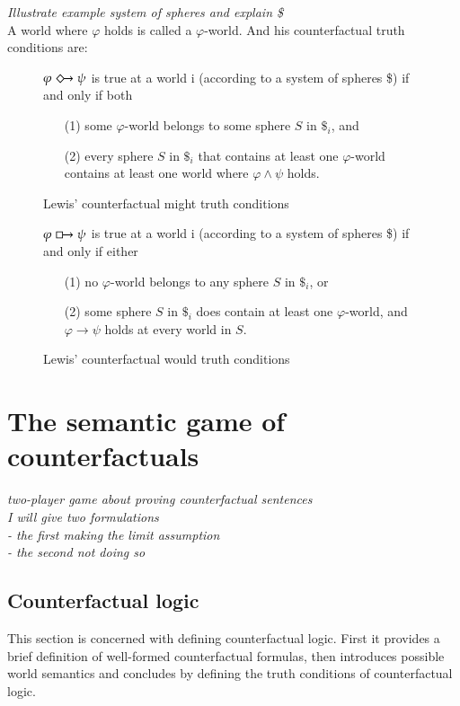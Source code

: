 \documentclass[a4paper,american]{paper}
\theoremstyle{definition}\newtheorem{definition}{Definition}
\begin{document}
\noindent \textit{Illustrate example system of spheres and explain \$}\\
A world where $\varphi$ holds is called a $\varphi$-world.
\noindent And his counterfactual truth conditions are:
\begin{figure}[H]
	\centering
	$\varphi\Diamondright\psi$ is true at a world i (according to a system of spheres \$) if and only if both
	\begin{itemize}
	\item[(1)] some $\varphi$-world belongs to some sphere $S$ in $\$_i$, and
	\item[(2)] every sphere $S$ in $\$_i$ that contains at least one $\varphi$-world contains at least one world where $\varphi\wedge\psi$ holds.
	\end{itemize}
	\caption{Lewis' counterfactual might truth conditions}
	\label{fig:counterfactual_might}
\end{figure}
\begin{figure}[H]
	\centering
	$\varphi\boxright\psi$ is true at a world i (according to a system of spheres \$) if and only if either
	\begin{itemize}
	\item[(1)] no $\varphi$-world belongs to any sphere $S$ in $\$_i$, or
	\item[(2)] some sphere $S$ in $\$_i$ does contain at least one $\varphi$-world, and $\varphi\rightarrow\psi$ holds at every world in $S$.
	\end{itemize}
	\caption{Lewis' counterfactual would truth conditions}
	\label{fig:counterfactual_would}
\end{figure}
\section{The semantic game of counterfactuals}
\textit{two-player game about proving counterfactual sentences\\
I will give two formulations\\
- the first making the limit assumption\\
- the second not doing so}
\subsection{Counterfactual logic}
This section is concerned with defining counterfactual logic. First it provides a brief definition of well-formed counterfactual formulas, then introduces possible world semantics and concludes by defining the truth conditions of counterfactual logic.
\end{document}
